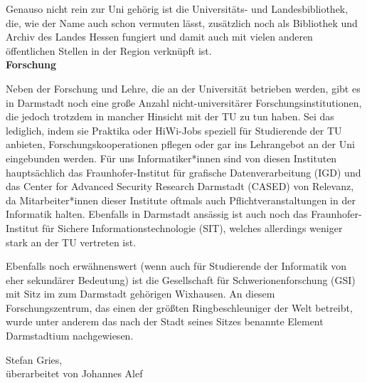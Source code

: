 {    Genauso nicht rein zur Uni gehörig ist die Universitäts- und Landesbibliothek, die, wie der Name auch schon vermuten lässt, zusätzlich noch als Bibliothek und Archiv des Landes Hessen fungiert und damit auch mit vielen anderen öffentlichen Stellen in der Region verknüpft ist.\\

    \textbf{Forschung}

    Neben der Forschung und Lehre, die an der Universität betrieben werden, gibt es in Darmstadt noch eine große Anzahl nicht-universitärer Forschungsinstitutionen, die jedoch trotzdem in mancher Hinsicht mit der TU zu tun haben. Sei das lediglich, indem sie Praktika oder HiWi-Jobs speziell für Studierende der TU anbieten, Forschungskooperationen pflegen oder gar ins Lehrangebot an der Uni eingebunden werden.
    Für uns Informatiker*innen sind von diesen Instituten hauptsächlich das Fraunhofer-Institut für grafische Datenverarbeitung (IGD) und das Center for Advanced Security Research Darmstadt (CASED) von Relevanz, da Mitarbeiter*innen dieser Institute oftmals auch Pflichtveranstaltungen in der Informatik halten. Ebenfalls in Darmstadt ansässig ist auch noch das Fraunhofer-Institut für Sichere Informationstechnologie (SIT), welches allerdings weniger stark an der TU vertreten ist.

    Ebenfalls noch erwähnenswert (wenn auch für Studierende der Informatik von eher sekundärer Bedeutung) ist die Gesellschaft für Schwerionenforschung (GSI) mit Sitz im zum Darmstadt gehörigen Wixhausen. An diesem Forschungszentrum, das einen der größten Ringbeschleuniger der Welt betreibt, wurde unter anderem das nach der Stadt seines Sitzes benannte Element Darmstadtium nachgewiesen.}
{Stefan Gries, \\überarbeitet von Johannes Alef}
\newpage
